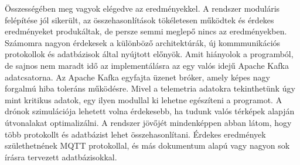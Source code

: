 
Összességében meg vagyok elégedve az eredményekkel.
A rendszer moduláris felépítése jól sikerült, az összehasonlítások tökéletesen működtek és érdekes eredményeket produkáltak, de persze semmi meglepő nincs az eredményekben.
Számomra nagyon érdekesek a különböző architektúrák, új kommmunikációs protokollok és adatbázisok által nyújtott előnyök.
Amit hiányolok a programból, de sajnos nem maradt idő az implementálásra az egy valós idejű Apache Kafka adatcsatorna.
Az Apache Kafka egyfajta üzenet bróker, amely képes nagy forgalmú hiba toleráns működésre.
Mivel a telemetria adatokra tekinthetünk úgy mint kritikus adatok, egy ilyen modullal ki lehetne egészíteni a programot.
A drónok szimulációja lehetett volna érdekesebb, ha tudunk valós térképek alapján útvonalakat optimalizálni.
A rendszer jövőjét mindenképpen abban látom, hogy több protokollt és adatbázist lehet összehasonlítani.
Érdekes eredmények születhetnének MQTT protokollal, és más dokumentum alapú vagy nagyon sok írásra tervezett adatbázisokkal.


